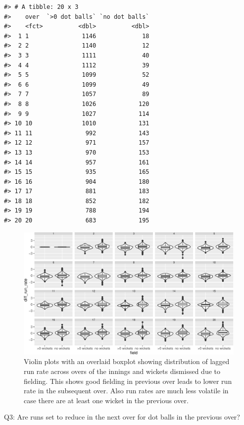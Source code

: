\documentclass[12pt]{article}
\begin{document}
\begin{verbatim}
#> # A tibble: 20 x 3
#>    over  `>0 dot balls` `no dot balls`
#>    <fct>          <dbl>          <dbl>
#>  1 1               1146             18
#>  2 2               1140             12
#>  3 3               1111             40
#>  4 4               1112             39
#>  5 5               1099             52
#>  6 6               1099             49
#>  7 7               1057             89
#>  8 8               1026            120
#>  9 9               1027            114
#> 10 10              1010            131
#> 11 11               992            143
#> 12 12               971            157
#> 13 13               970            153
#> 14 14               957            161
#> 15 15               935            165
#> 16 16               904            180
#> 17 17               881            183
#> 18 18               852            182
#> 19 19               788            194
#> 20 20               683            195
\end{verbatim}

\begin{figure}

{\centering \includegraphics[width=\textwidth]{figure/field-1} 

}

\caption{Violin plots with an overlaid boxplot showing distribution of lagged run rate across overs of the innings and wickets dismissed due to fielding. This shows good fielding in previous over leads to lower run rate in the subsequent over. Also run rates are much less volatile in case there are at least one wicket in the previous over.}\label{fig:field}
\end{figure}

Q3: Are runs set to reduce in the next over for dot balls in the previous over?
\end{document}
